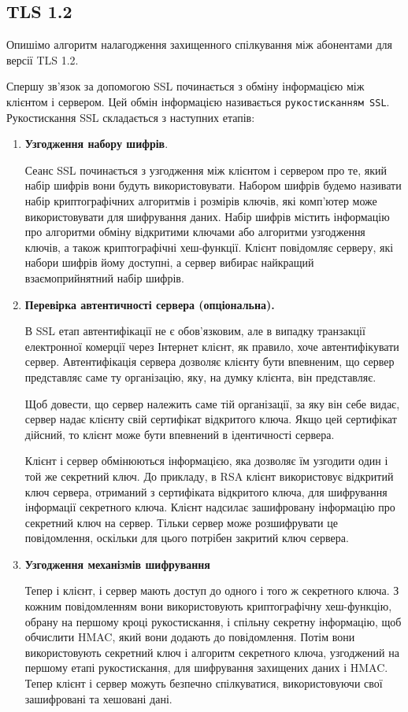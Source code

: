 \subsection{TLS 1.2}

Опишімо алгоритм налагодження захищенного спілкування між абонентами для версії TLS 1.2.

Спершу зв'язок за допомогою SSL починається з обміну інформацією між клієнтом і сервером. Цей обмін інформацією називається \texttt{рукостисканням SSL}. Рукостискання SSL складається з наступних етапів:
\begin{enumerate}
    \item \textbf{Узгодження набору шифрів}. 
    
    Сеанс SSL починається з узгодження між клієнтом і сервером про те, який набір шифрів вони будуть використовувати. Набором шифрів будемо називати набір криптографічних алгоритмів і розмірів ключів, які комп'ютер може використовувати для шифрування даних. Набір шифрів містить інформацію про алгоритми обміну відкритими ключами або алгоритми узгодження ключів, а також криптографічні хеш-функції. Клієнт повідомляє серверу, які набори шифрів йому доступні, а сервер вибирає найкращий взаємоприйнятний набір шифрів.
    
    \item \textbf{Перевірка автентичності сервера (опціональна).}
    
    В SSL етап автентифікації не є обов'язковим, але в випадку транзакції електронної комерції через Інтернет клієнт, як правило, хоче автентифікувати сервер. Автентифікація сервера дозволяє клієнту бути впевненим, що сервер представляє саме ту організацію, яку, на думку клієнта, він представляє.
    
    Щоб довести, що сервер належить саме тій організації, за яку він себе видає, сервер надає клієнту свій сертифікат відкритого ключа. Якщо цей сертифікат дійсний, то клієнт може бути впевнений в ідентичності сервера.

    Клієнт і сервер обмінюються інформацією, яка дозволяє їм узгодити один і той же секретний ключ. До прикладу, в RSA клієнт використовує відкритий ключ сервера, отриманий з сертифіката відкритого ключа, для шифрування інформації секретного ключа. Клієнт надсилає зашифровану інформацію про секретний ключ на сервер. Тільки сервер може розшифрувати це повідомлення, оскільки для цього потрібен закритий ключ сервера.
    
    \item \textbf{Узгодження механізмів шифрування}
    
    Тепер і клієнт, і сервер мають доступ до одного і того ж секретного ключа. З кожним повідомленням вони використовують криптографічну хеш-функцію, обрану на першому кроці рукостискання, і спільну секретну інформацію, щоб обчислити HMAC, який вони додають до повідомлення. Потім вони використовують секретний ключ і алгоритм секретного ключа, узгоджений на першому етапі рукостискання, для шифрування захищених даних і HMAC. Тепер клієнт і сервер можуть безпечно спілкуватися, використовуючи свої зашифровані та хешовані дані.
\end{enumerate}

